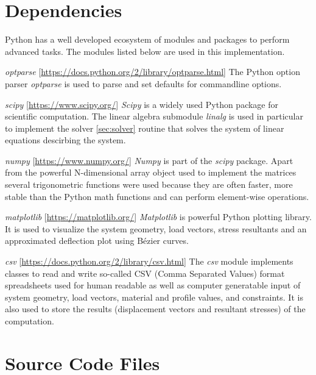 \section{Dependencies}
\label{sec:depend}

Python has a well developed ecosystem of modules and packages to perform advanced tasks.
The modules listed below are used in this implementation.
 
\textit{optparse} [\url{https://docs.python.org/2/library/optparse.html}] \linebreak
The Python option parser \textit{optparse} is used to parse and set defaults for commandline options.

\textit{scipy} [\url{https://www.scipy.org/}]\linebreak
\textit{Scipy} is a widely used Python package for scientific computation. The linear algebra submodule \textit{linalg} is used in particular to implement the solver \ref{sec:solver} routine that solves the system of linear equations descirbing the system.

\textit{numpy} [\url{https://www.numpy.org/}]\linebreak
\textit{Numpy} is part of the \textit{scipy} package. Apart from the powerful N-dimensional array object used to implement the matrices several trigonometric functions were used because they are often faster, more stable than the Python math functions and can perform element-wise operations.

\textit{matplotlib} [\url{https://matplotlib.org/}]\linebreak
\textit{Matplotlib} is powerful Python plotting library. It is used to visualize the system geometry, load vectors, stress resultants and an approximated deflection plot using B\'{e}zier curves.

\textit{csv} [\url{https://docs.python.org/2/library/csv.html}]\linebreak
The \textit{csv} module implements classes to read and write so-called CSV (Comma Separated Values) format spreadsheets used for human readable as well as computer generatable input of system geometry, load vectors, material and profile values, and constraints.
It is also used to store the results (displacement vectors and resultant stresses) of the computation.

\pagebreak

\section{Source Code Files}
\label{sec:srcfiles}

